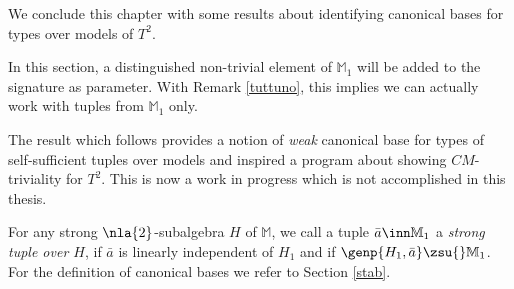 We conclude this chapter with some results about identifying
canonical bases for types over models of $T^{2}$.

In this section, a distinguished non-trivial element of $\mathbb{M}_{1}$ will be added to the signature as parameter.
With Remark \ref{tuttuno}, this implies we can actually work with tuples from $\mathbb{M}_{1}$ only.

The result which follows
provides a notion of {\em weak} canonical base for types of self-sufficient tuples over models
and inspired a program about showing $CM$-triviality for $T^{2}$. This is now
a work in progress which is not accomplished in this thesis.

\medskip
For any strong $\nla{2}$-subalgebra $H$ of $\mathbb{M}$, we call a tuple $\bar a\inn\mathbb{M}_{1}$ a {\em strong tuple over $H$},
if $\bar a$ is linearly independent of $H_{1}$ and if $\genp{H_{1},\bar a}\zsu{}\mathbb{M}_{1}$. For the
definition of canonical bases we refer to Section \ref{stab}.

